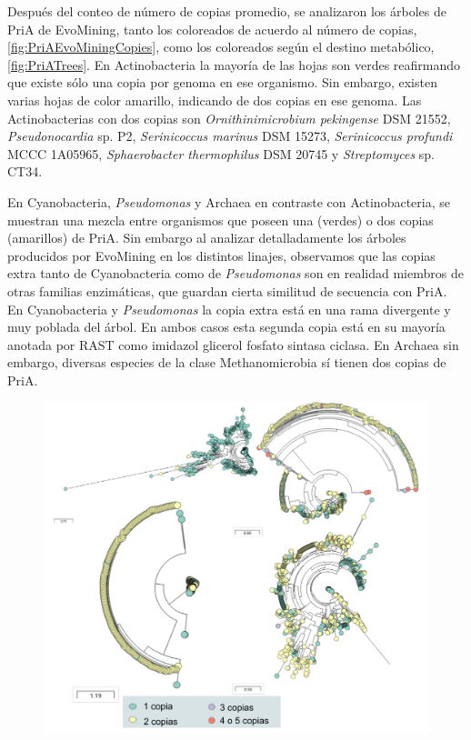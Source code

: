 \documentclass[12pt,twoside]{reedthesis}
\begin{document}
  Después del conteo de número de copias promedio, se analizaron los
  árboles de PriA de EvoMining, tanto los coloreados de acuerdo al número
  de copias, \autoref{fig:PriAEvoMiningCopies}, como los coloreados según
  el destino metabólico, \autoref{fig:PriATrees}. En Actinobacteria la
  mayoría de las hojas son verdes reafirmando que existe sólo una copia
  por genoma en ese organismo. Sin embargo, existen varias hojas de color
  amarillo, indicando de dos copias en ese genoma. Las Actinobacterias con
  dos copias son \emph{Ornithinimicrobium pekingense} DSM 21552,
  \emph{Pseudonocardia} sp. P2, \emph{Serinicoccus marinus} DSM 15273,
  \emph{Serinicoccus profundi} MCCC 1A05965, \emph{Sphaerobacter
  thermophilus} DSM 20745 y \emph{Streptomyces} sp. CT34.
  
  En Cyanobacteria, \emph{Pseudomonas} y Archaea en contraste con
  Actinobacteria, se muestran una mezcla entre organismos que poseen una
  (verdes) o dos copias (amarillos) de PriA. Sin embargo al analizar
  detalladamente los árboles producidos por EvoMining en los distintos
  linajes, observamos que las copias extra tanto de Cyanobacteria como de
  \emph{Pseudomonas} son en realidad miembros de otras familias
  enzimáticas, que guardan cierta similitud de secuencia con PriA. En
  Cyanobacteria y \emph{Pseudomonas} la copia extra está en una rama
  divergente y muy poblada del árbol. En ambos casos esta segunda copia
  está en su mayoría anotada por RAST como imidazol glicerol fosfato
  sintasa ciclasa. En Archaea sin embargo, diversas especies de la clase
  Methanomicrobia sí tienen dos copias de PriA.
  
  \begin{figure}[h!tbp]
  \centering
  \includegraphics[angle = 0,scale = 0.8]{chapter4/PriAEvoMiningCopies.pdf}
  \caption[Copias extras de PriA en Actinobacteria, Cyanobacteria, Pseudomonas y Archaea]{\footnotesize{}}
  \label{fig:PriAEvoMiningCopies}
  \end{figure}
  
\end{document}
